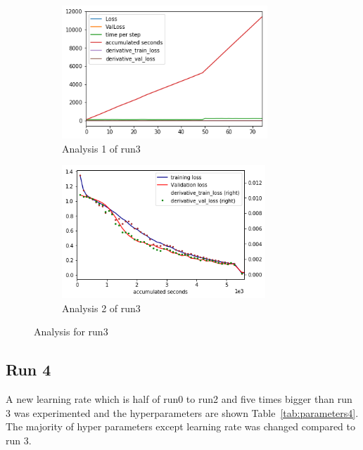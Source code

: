 \documentclass[paper=a4, fontsize=11pt]{scrartcl} %
\numberwithin{equation}{section} %
\numberwithin{figure}{section} %
\numberwithin{table}{section} %
\begin{document}
\begin{figure}	
	\begin{subfigure}{0.45\textwidth}
	\includegraphics[width=0.9\linewidth, height=5cm]{./imgs/analysis_0_3.png} 
	\caption{Analysis 1 of run3}
	\label{fig:subAnalysisRun3}
	\end{subfigure}
	\begin{subfigure}{0.45\textwidth}
	\includegraphics[width=0.9\linewidth, height=5cm]{./imgs/analysis_3plot.png}
	\caption{Analysis 2 of run3}
	\label{fig:subAnalysisRun3plot}
	\end{subfigure}
	 
	\caption{Analysis for run3}
	\label{fig:AnalysisRun3}
 \end{figure}

\subsection{Run 4}

A new learning rate which is half of run0 to run2 and five times bigger than run 3 was experimented and the hyperparameters are shown Table~\ref{tab:parameters4}. The majority of hyper parameters except learning rate was changed compared to run 3.
\end{document}
